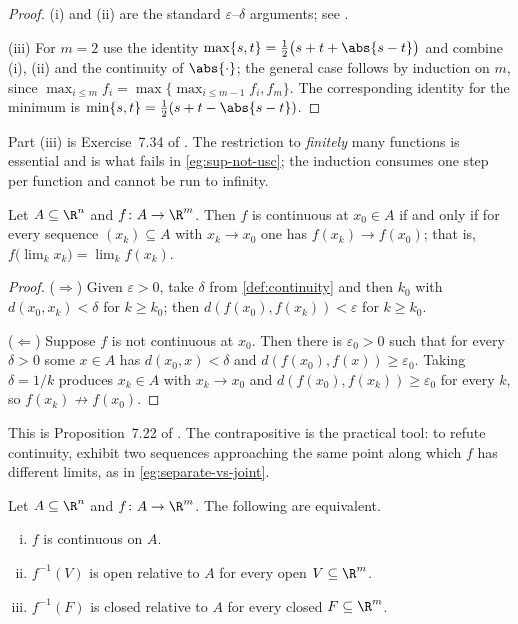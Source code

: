 \begin{proof}
	(i) and (ii) are the standard $\varepsilon$--$\delta$ arguments; see
	\textcite[Thms.~4.4 and~4.7]{rudin1976principles}.

	(iii) For $m=2$ use the identity
	$\max\{s,t\}=\tfrac12\bigl(s+t+\abs{s-t}\bigr)$ and combine (i), (ii) and the
	continuity of $\abs{\cdot}$; the general case follows by induction on $m$, since
	$\max_{i\leq m}f_i=\max\{\max_{i\leq m-1}f_i,f_m\}$. The corresponding identity
	for the minimum is $\min\{s,t\}=\tfrac12(s+t-\abs{s-t})$.
\end{proof}

Part (iii) is Exercise~7.34 of \autocite[slide 56]{fukuda2026analysis}. The
restriction to \emph{finitely} many functions is essential and is what
fails in \autoref{eg:sup-not-usc}; the induction consumes one step per function
and cannot be run to infinity.

\begin{proposition}\label{prop:sequential-continuity}
	Let $A\subseteq\R^n$ and $f\colon A\to\R^m$. Then $f$ is continuous at $x_0\in A$
	if and only if for every sequence $(x_k)\subseteq A$ with $x_k\to x_0$ one has
	$f(x_k)\to f(x_0)$; that is,
	$f\bigl(\lim_{k}x_k\bigr)=\lim_{k}f(x_k)$.
\end{proposition}

\begin{proof}
	($\Rightarrow$) Given $\varepsilon>0$, take $\delta$ from
	\autoref{def:continuity} and then $k_0$ with $d(x_0,x_k)<\delta$ for $k\geq k_0$;
	then $d(f(x_0),f(x_k))<\varepsilon$ for $k\geq k_0$.

	($\Leftarrow$) Suppose $f$ is not continuous at $x_0$. Then there is
	$\varepsilon_0>0$ such that for every $\delta>0$ some $x\in A$ has
	$d(x_0,x)<\delta$ and $d(f(x_0),f(x))\geq\varepsilon_0$. Taking
	$\delta=1/k$ produces $x_k\in A$ with $x_k\to x_0$ and
	$d(f(x_0),f(x_k))\geq\varepsilon_0$ for every $k$, so $f(x_k)\not\to f(x_0)$.
\end{proof}

This is Proposition~7.22 of \textcite{fukuda2026notes}
\autocite[slide 57]{fukuda2026analysis}. The contrapositive is the practical
tool: to refute continuity, exhibit two sequences approaching the same point
along which $f$ has different limits, as in
\autoref{eg:separate-vs-joint}.

\begin{theorem}\label{thm:continuity-preimage}
	Let $A\subseteq\R^n$ and $f\colon A\to\R^m$. The following are equivalent.
	\begin{enumerate}[(i)]
		\item $f$ is continuous on $A$.
		\item $f^{-1}(V)$ is open relative to $A$ for every open $V\subseteq\R^m$.
		\item $f^{-1}(F)$ is closed relative to $A$ for every closed $F\subseteq\R^m$.
	\end{enumerate}
\end{theorem}

